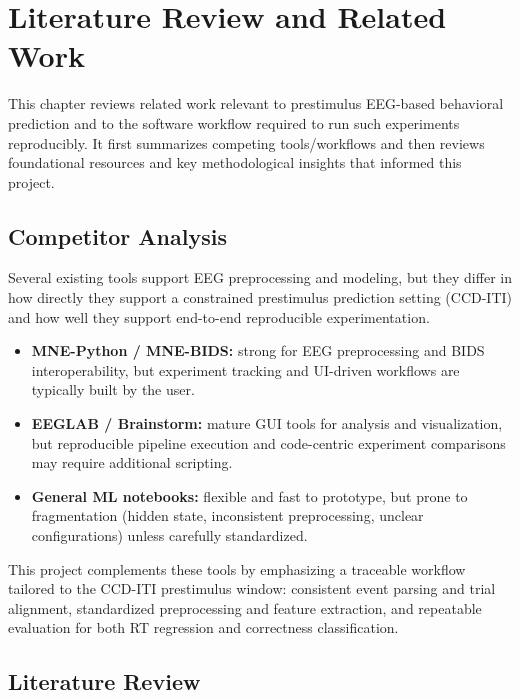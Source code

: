\chapter{Literature Review and Related Work}
\label{ch:relatedworks}

\noindent
This chapter reviews related work relevant to prestimulus EEG-based behavioral prediction and to the software workflow required to run such experiments reproducibly. It first summarizes competing tools/workflows and then reviews foundational resources and key methodological insights that informed this project.
\vspace{1em}

\section{Competitor Analysis}
\label{sec:competitor-analysis}

Several existing tools support EEG preprocessing and modeling, but they differ in how directly they support a constrained prestimulus prediction setting (CCD-ITI) and how well they support end-to-end reproducible experimentation.

\begin{itemize}
    \item \textbf{MNE-Python / MNE-BIDS:} strong for EEG preprocessing and BIDS interoperability, but experiment tracking and UI-driven workflows are typically built by the user.
    \item \textbf{EEGLAB / Brainstorm:} mature GUI tools for analysis and visualization, but reproducible pipeline execution and code-centric experiment comparisons may require additional scripting.
    \item \textbf{General ML notebooks:} flexible and fast to prototype, but prone to fragmentation (hidden state, inconsistent preprocessing, unclear configurations) unless carefully standardized.
\end{itemize}

This project complements these tools by emphasizing a traceable workflow tailored to the CCD-ITI prestimulus window: consistent event parsing and trial alignment, standardized preprocessing and feature extraction, and repeatable evaluation for both RT regression and correctness classification.

\section{Literature Review}
\label{sec:literature-review}

